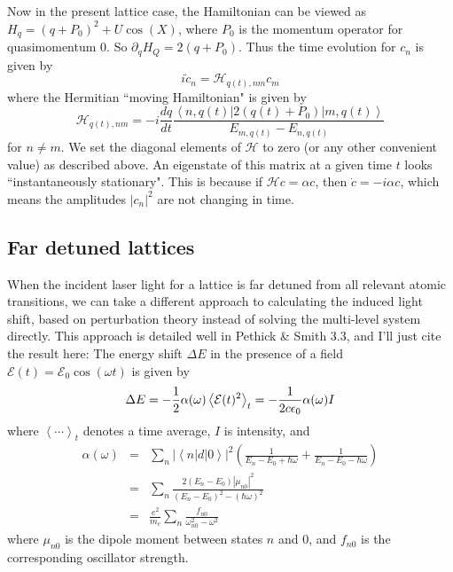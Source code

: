 \documentclass[aps,twocolumn,prb,floatfix,amsmath,amssymb,groupedaddress]{revtex4}
\begin{document}
Now in the present lattice case, the Hamiltonian can be viewed as $H_q = (q+P_0)^2 + U\cos(X)$, where $P_0$ is the momentum operator for quasimomentum $0$.  So $\partial_q H_Q = 2(q+P_0)$.  Thus the time evolution for $c_n$ is given by
\begin{equation}
i\dot{c}_n = \mathcal{H}_{q(t),nm}c_m
\end{equation}
where the Hermitian ``moving Hamiltonian" is given by
\begin{equation}
\mathcal{H}_{q(t),nm} = -i\frac{dq}{dt} \frac{\left<n,q(t)\right|2\left(q(t)+P_0\right)\left|m,q(t)\right>}{E_{m,q(t)}-E_{n,q(t)}}
\end{equation}
for $n\neq m$.  We set the diagonal elements of $\mathcal{H}$ to zero (or any other convenient value) as described above.  An eigenstate of this matrix at a given time $t$ looks ``instantaneously stationary".  This is because if $\mathcal{H}c = \alpha c$, then $\dot{c} = -i\alpha c$, which means the amplitudes $|c_n|^2$ are not changing in time.

\subsection{Far detuned lattices}
When the incident laser light for a lattice is far detuned from all relevant atomic transitions, we can take a different approach to calculating the induced light shift, based on perturbation theory instead of solving the multi-level system directly.  This approach is detailed well in Pethick \& Smith 3.3, and I'll just cite the result here:  The energy shift $\Delta E$ in the presence of a field $\mathcal{E}(t) = \mathcal{E}_0 \cos(\omega t)$ is given by 
\[ \Delta E = -{\frac{1}{2}} \alpha(\omega) \left<\mathcal{E}(t)^2\right>_t = -\frac{1}{2c\epsilon_0} \alpha(\omega) I\]
where $\left<\cdots\right>_t$ denotes a time average, $I$ is intensity, and 
\begin{eqnarray*}
\alpha(\omega) & = & \sum_n \left| \left<n\right| d \left| 0\right>\right|^2 \left(\frac{1}{E_n -E_0 + \hbar \omega} + \frac{1}{E_n -E_0 -\hbar \omega}\right) \\
& = & \sum_n \frac{2\left(E_n - E_0\right) |\mu_{n0}|^2}{(E_n - E_0)^2 - (\hbar \omega)^2} \\
& = & \frac{e^2}{m_e} \sum_n \frac{f_{n0}}{\omega_{n0}^2 - \omega^2}
\end{eqnarray*}
where $\mu_{n0}$ is the dipole moment between states $n$ and $0$, and $f_{n0}$ is the corresponding oscillator strength.  
\end{document}

